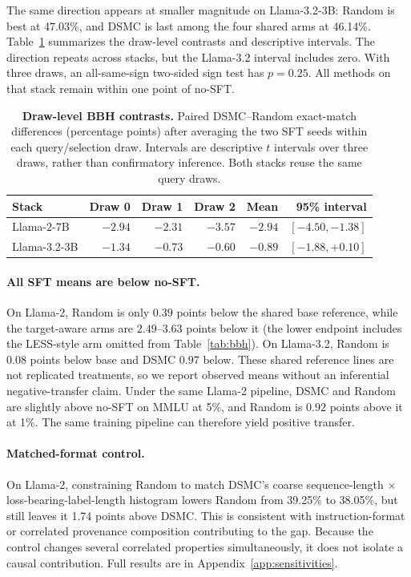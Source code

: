 \documentclass{article}
\newcommand{\method}{\textsc{DSMC}}
\begin{document}
The same direction appears at smaller magnitude on Llama-3.2-3B: Random is
best at 47.03\%, and \method{} is last among the four shared arms at
46.14\%. Table~\ref{tab:bbh_draw_contrasts} summarizes the draw-level
contrasts and descriptive intervals. The direction repeats across stacks, but
the Llama-3.2 interval includes zero. With three draws, an all-same-sign
two-sided sign test has $p=0.25$. All methods on that stack remain within one
point of no-SFT.

\begin{table}[t]
\caption{\textbf{Draw-level BBH contrasts.}
Paired \method{}--Random exact-match differences (percentage points) after
averaging the two SFT seeds within each query/selection draw. Intervals are
descriptive $t$ intervals over three draws, rather than confirmatory
inference. Both stacks reuse the same query draws.}
\label{tab:bbh_draw_contrasts}
\centering
\small
\setlength{\tabcolsep}{3.5pt}
\begin{tabular}{lrrrrr}
\toprule
Stack & Draw 0 & Draw 1 & Draw 2 & Mean & 95\% interval \\
\midrule
Llama-2-7B   & $-2.94$ & $-2.31$ & $-3.57$ & $-2.94$ & $[-4.50,-1.38]$ \\
Llama-3.2-3B & $-1.34$ & $-0.73$ & $-0.60$ & $-0.89$ & $[-1.88,+0.10]$ \\
\bottomrule
\end{tabular}
\end{table}

\paragraph{All SFT means are below no-SFT.}
On Llama-2, Random is only $0.39$ points below the shared base reference, while
the target-aware arms are $2.49$--$3.63$ points below it (the lower endpoint
includes the LESS-style arm omitted from Table~\ref{tab:bbh}). On Llama-3.2,
Random is $0.08$ points below base and \method{} $0.97$ below. These shared
reference lines are not replicated treatments, so we report observed means
without an inferential negative-transfer claim. Under the same Llama-2
pipeline, \method{} and Random are slightly above no-SFT on MMLU at 5\%, and
Random is $0.92$ points above it at 1\%. The same training pipeline can
therefore yield positive transfer.

\paragraph{Matched-format control.}
On Llama-2, constraining Random to match \method{}'s coarse sequence-length
$\times$ loss-bearing-label-length histogram lowers Random from 39.25\% to
38.05\%, but still leaves it 1.74 points above \method{}. This is consistent
with instruction-format or correlated provenance composition contributing to
the gap. Because the control changes several correlated properties
simultaneously, it does not isolate a causal contribution. Full results are in
Appendix~\ref{app:sensitivities}.
\end{document}
